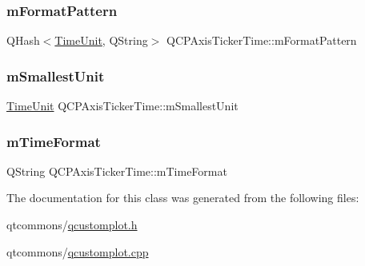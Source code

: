 \subsubsection{\texorpdfstring{mFormatPattern}{mFormatPattern}}
{\footnotesize\ttfamily Q\+Hash$<$\mbox{\hyperlink{class_q_c_p_axis_ticker_time_a5c48ded8c6d3a1aca9b68219469fea3e}{Time\+Unit}}, Q\+String$>$ Q\+C\+P\+Axis\+Ticker\+Time\+::m\+Format\+Pattern\hspace{0.3cm}{\ttfamily [protected]}}

\mbox{\label{class_q_c_p_axis_ticker_time_a61033c493cec76a69628d1aaa5b07abf}} 
\subsubsection{\texorpdfstring{mSmallestUnit}{mSmallestUnit}}
{\footnotesize\ttfamily \mbox{\hyperlink{class_q_c_p_axis_ticker_time_a5c48ded8c6d3a1aca9b68219469fea3e}{Time\+Unit}} Q\+C\+P\+Axis\+Ticker\+Time\+::m\+Smallest\+Unit\hspace{0.3cm}{\ttfamily [protected]}}

\mbox{\label{class_q_c_p_axis_ticker_time_a800af3fe0a7c1a8110c043b82169bc9d}} 
\subsubsection{\texorpdfstring{mTimeFormat}{mTimeFormat}}
{\footnotesize\ttfamily Q\+String Q\+C\+P\+Axis\+Ticker\+Time\+::m\+Time\+Format\hspace{0.3cm}{\ttfamily [protected]}}



The documentation for this class was generated from the following files\+:\begin{DoxyCompactItemize}
\item 
qtcommons/\mbox{\hyperlink{qcustomplot_8h}{qcustomplot.\+h}}\item 
qtcommons/\mbox{\hyperlink{qcustomplot_8cpp}{qcustomplot.\+cpp}}\end{DoxyCompactItemize}
